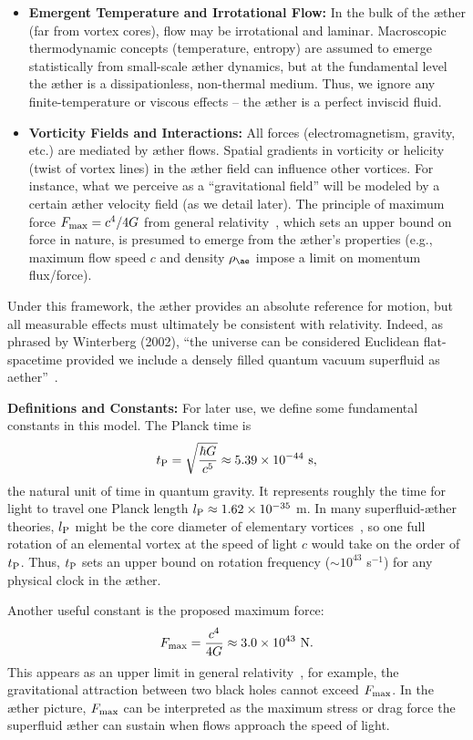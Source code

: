 \begin{itemize}
    \item \textbf{Emergent Temperature and Irrotational Flow:} In the bulk of the æther (far from vortex cores), flow may be irrotational and laminar. Macroscopic thermodynamic concepts (temperature, entropy) are assumed to emerge statistically from small-scale æther dynamics, but at the fundamental level the æther is a dissipationless, non-thermal medium. Thus, we ignore any finite-temperature or viscous effects – the æther is a perfect inviscid fluid.

    \item \textbf{Vorticity Fields and Interactions:} All forces (electromagnetism, gravity, etc.) are mediated by æther flows. Spatial gradients in vorticity or helicity (twist of vortex lines) in the æther field can influence other vortices. For instance, what we perceive as a “gravitational field” will be modeled by a certain æther velocity field (as we detail later). The principle of maximum force $F_{\rm max} = c^4 / 4G$ from general relativity~\cite{Schiller2022-maxforce}, which sets an upper bound on force in nature, is presumed to emerge from the æther’s properties (e.g., maximum flow speed $c$ and density $\rho_{\ae}$ impose a limit on momentum flux/force).
\end{itemize}

Under this framework, the æther provides an absolute reference for motion, but all measurable effects must ultimately be consistent with relativity. Indeed, as phrased by Winterberg (2002), ``the universe can be considered Euclidean flat-spacetime provided we include a densely filled quantum vacuum superfluid as aether''~\cite{Winterberg2002-PlanckAether}.

\textbf{Definitions and Constants:} For later use, we define some fundamental constants in this model. The Planck time is
\[
t_{\rm P} = \sqrt{\frac{\hbar G}{c^5}} \approx 5.39\times10^{-44}\ \text{s},
\]
the natural unit of time in quantum gravity. It represents roughly the time for light to travel one Planck length $l_{\rm P} \approx 1.62\times10^{-35}$ m. In many superfluid-æther theories, $l_{\rm P}$ might be the core diameter of elementary vortices~\cite{Winterberg2002-PlanckAether}, so one full rotation of an elemental vortex at the speed of light $c$ would take on the order of $t_{\rm P}$. Thus, $t_{\rm P}$ sets an upper bound on rotation frequency ($\sim 10^{43}$ s$^{-1}$) for any physical clock in the æther.

Another useful constant is the proposed maximum force:
\[
F_{\rm max} = \frac{c^4}{4G} \approx 3.0\times10^{43}\ \text{N}.
\]
This appears as an upper limit in general relativity~\cite{Schiller2022-maxforce}, for example, the gravitational attraction between two black holes cannot exceed $F_{\rm max}$. In the æther picture, $F_{\rm max}$ can be interpreted as the maximum stress or drag force the superfluid æther can sustain when flows approach the speed of light.

